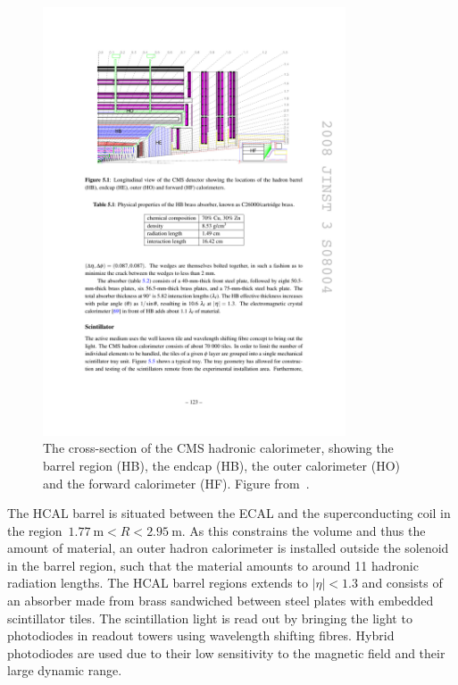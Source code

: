 \begin{figure}
\begin{centering}
\includegraphics[width=0.8\textwidth]{figures/exp/hcal.pdf}
\caption[The cross-section of the CMS hadronic calorimeter]{The cross-section of the CMS hadronic calorimeter, showing the barrel region (HB), the endcap (HB), the outer calorimeter (HO) and the forward calorimeter (HF). Figure from~\cite{Chatrchyan:2008aa}.}
\label{fig:hcal}
\end{centering}
\end{figure}

The HCAL barrel is situated between the ECAL and the superconducting coil in the region~$1.77~\mathrm{m} < R < 2.95~\mathrm{m}$. As this constrains the volume and thus the amount of material, an outer hadron calorimeter is installed outside the solenoid in the barrel region, such that the material amounts to around 11 hadronic radiation lengths. The HCAL barrel regions extends to $|\eta| < 1.3$ and consists of an absorber made from brass sandwiched between steel plates with embedded scintillator tiles. The scintillation light is read out by bringing the light to photodiodes in readout towers using wavelength shifting fibres. Hybrid photodiodes are used due to their low sensitivity to the magnetic field and their large dynamic range.

